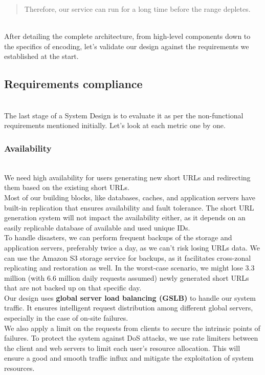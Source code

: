 \begin{quote}
Therefore, our service can run for a long time before the range depletes.
\end{quote}
\\
After detailing the complete architecture, from high-level components down to the specifics of encoding, let's validate our design against the requirements we established at the start.

\subsection{Requirements compliance}\label{DkMhDEdpTSzYdbs9ZWxLe}
\\
The last stage of a System Design is to evaluate it as per the non-functional requirements mentioned initially. Let's look at each metric one by one.

\subsubsection{Availability}\label{B59SvF9ESn1nWkqSsWeMw}
\\
We need high availability for users generating new short URLs and redirecting them based on the existing short URLs.
\\
Most of our building blocks, like databases, caches, and application servers have built-in replication that ensures availability and fault tolerance. The short URL generation system will not impact the availability either, as it depends on an easily replicable database of available and used unique IDs.
\\
To handle disasters, we can perform frequent backups of the storage and application servers, preferably twice a day, as we can't risk losing URLs data. We can use the Amazon S3 storage service for backups, as it facilitates cross-zonal replicating and restoration as well. In the worst-case scenario, we might lose 3.3 million (with 6.6 million daily requests assumed) newly generated short URLs that are not backed up on that specific day.
\\
Our design uses \textbf{global server load balancing (GSLB)} to handle our system traffic. It ensures intelligent request distribution among different global servers, especially in the case of on-site failures.
\\
We also apply a limit on the requests from clients to secure the intrinsic points of failures. To protect the system against DoS attacks, we use rate limiters between the client and web servers to limit each user's resource allocation. This will ensure a good and smooth traffic influx and mitigate the exploitation of system resources.

